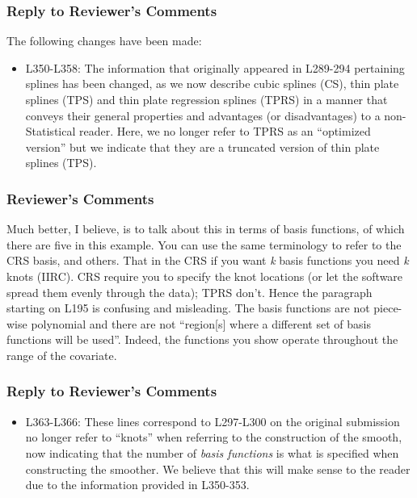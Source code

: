 \documentclass[
]{article}
\providecommand{\tightlist}{%
  \setlength{\itemsep}{0pt}\setlength{\parskip}{0pt}}
\begin{document}
\hypertarget{section-4}{%
\subsubsection{\texorpdfstring{\textcolor{reviewersblue} {Reply to Reviewer's Comments}}{}}\label{section-4}}

The following changes have been made:

\begin{itemize}
\tightlist
\item
  L350-L358: The information that originally appeared in L289-294 pertaining splines has been changed, as we now describe cubic splines (CS), thin plate splines (TPS) and thin plate regression splines (TPRS) in a manner that conveys their general properties and advantages (or disadvantages) to a non-Statistical reader. Here, we no longer refer to TPRS as an ``optimized version'' but we indicate that they are a truncated version of thin plate splines (TPS).
\end{itemize}

\hypertarget{reviewers-comments-4}{%
\subsubsection{Reviewer's Comments}\label{reviewers-comments-4}}

Much better, I believe, is to talk about this in terms of basis functions, of which there are five in this example. You can use the same terminology to refer to the CRS basis, and others. That in the CRS if you want \emph{k} basis functions you need \emph{k} knots (IIRC). CRS require you to specify the knot locations (or let the software spread them evenly through the data); TPRS don't.
Hence the paragraph starting on L195 is confusing and misleading. The basis functions are not piece-wise polynomial and there are not ``region{[}s{]} where a different set of basis functions will be used''. Indeed, the functions you show operate throughout the range of the covariate.

\hypertarget{section-5}{%
\subsubsection{\texorpdfstring{\textcolor{reviewersblue} {Reply to Reviewer's Comments}}{}}\label{section-5}}

\begin{itemize}
\tightlist
\item
  L363-L366: These lines correspond to L297-L300 on the original submission no longer refer to ``knots'' when referring to the construction of the smooth, now indicating that the number of \emph{basis functions} is what is specified when constructing the smoother. We believe that this will make sense to the reader due to the information provided in L350-353.
\end{itemize}
\end{document}
